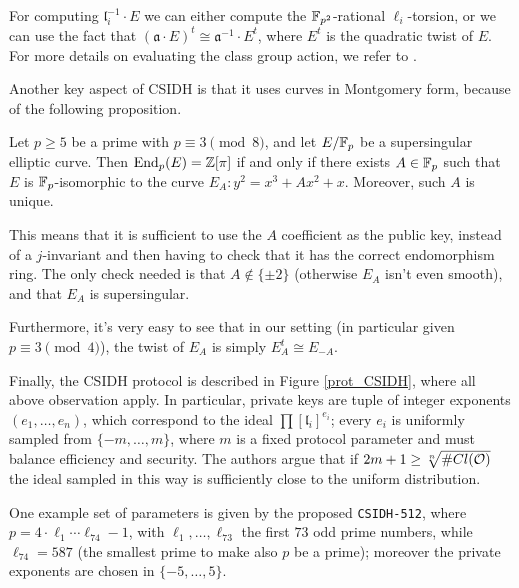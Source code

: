For computing $\mathfrak{l}_i^{-1}\cdot E$ we can either compute the $\mathbb{F}_{p^2}$-rational $\ell_i$-torsion, or we can use the fact that $(\mathfrak{a}\cdot E)^t\cong\mathfrak{a}^{-1}\cdot E^t$, where $E^t$ is the quadratic twist of $E$. For more details on evaluating the class group action, we refer to \cite[section 8]{CSIDH}.

Another key aspect of CSIDH is that it uses curves in Montgomery form, because of the following proposition.
\begin{proposition}
    Let $p\ge5$ be a prime with $p\equiv3\pmod8$, and let $E/\mathbb{F}_p$ be a supersingular elliptic curve. Then $\operatorname{End}_p(E)=\mathbb{Z}[\pi]$ if and only if there exists $A\in\mathbb{F}_p$ such that $E$ is $\mathbb{F}_p$-isomorphic to the curve $E_A:y^2=x^3+Ax^2+x$. Moreover, such $A$ is unique.
\end{proposition}

This means that it is sufficient to use the $A$ coefficient as the public key, instead of a $j$-invariant and then having to check that it has the correct endomorphism ring. The only check needed is that $A\not\in\{\pm2\}$ (otherwise $E_A$ isn't even smooth), and that $E_A$ is supersingular.

Furthermore, it's very easy to see that in our setting (in particular given $p\equiv3\pmod 4$), the twist of $E_A$ is simply $E_A^t\cong E_{-A}$.

Finally, the CSIDH protocol is described in Figure \ref{prot_CSIDH}, where all above observation apply. In particular, private keys are tuple of integer exponents $(e_1,\dots,e_n)$, which correspond to the ideal $\prod [\mathfrak{l}_i]^{e_i}$; every $e_i$ is uniformly sampled from $\{ -m,\dots,m \}$, where $m$ is a fixed protocol parameter and must balance efficiency and security. The authors argue that if $2m+1\ge\sqrt[n]{\# Cl(\mathcal{O})}$ the ideal sampled in this way is sufficiently close to the uniform distribution.

One example set of parameters is given by the proposed \texttt{CSIDH-512}, where $p=4\cdot\ell_1\cdots\ell_{74}-1$, with $\ell_1,\dots,\ell_{73}$ the first $73$ odd prime numbers, while $\ell_{74}=587$ (the smallest prime to make also $p$ be a prime); moreover the private exponents are chosen in $\{ -5,\dots,5 \}$.

